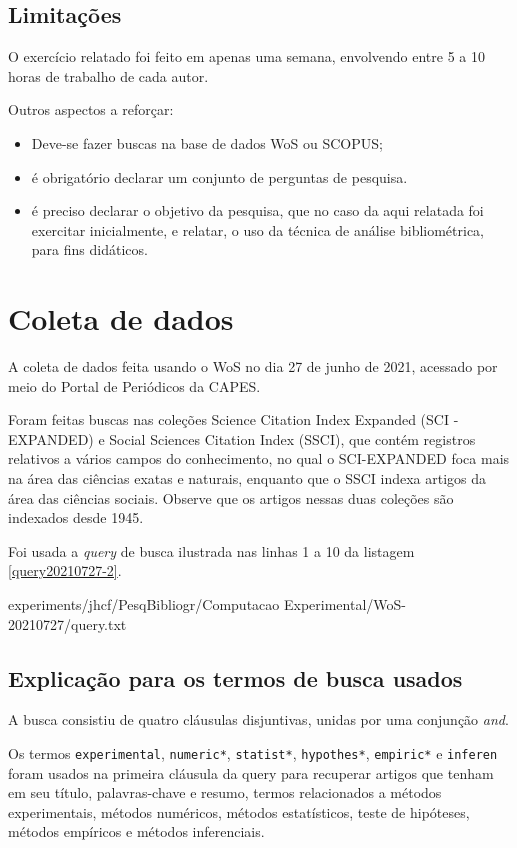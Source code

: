 \subsection{Limitações} O exercício relatado foi feito em apenas uma semana, envolvendo entre 5 a 10 horas de trabalho de cada autor.

Outros aspectos a reforçar:
\begin{itemize}
   
\item Deve-se fazer buscas na base de dados WoS ou SCOPUS;
\item é obrigatório declarar um conjunto de perguntas de pesquisa.
\item é preciso declarar o objetivo da pesquisa, que no caso da aqui relatada foi exercitar inicialmente, e relatar, o uso da técnica de análise bibliométrica, para fins didáticos.
\end{itemize}


\section{Coleta de dados}

A coleta de dados feita usando o WoS no dia 27 de junho de 2021, acessado por meio do Portal de Periódicos da CAPES.

Foram feitas buscas nas coleções Science  Citation  Index  Expanded (SCI -EXPANDED) e Social  Sciences  Citation  Index (SSCI), que contém registros relativos a vários campos do conhecimento, no qual o SCI-EXPANDED foca mais na área das ciências exatas e naturais, enquanto que o SSCI indexa artigos da área das ciências sociais. Observe que os artigos nessas duas coleções são indexados desde 1945. 

Foi usada a \textit{query} de busca ilustrada nas linhas 1 a 10 da listagem \ref{query20210727-2}.


{experiments/jhcf/PesqBibliogr/Computacao Experimental/WoS-20210727/query.txt}

\subsection{Explicação para os termos de busca usados}
A busca consistiu de quatro cláusulas disjuntivas, unidas por uma conjunção \textit{and}.

Os termos \texttt{experimental}, \texttt{numeric*}, \texttt{statist*}, \texttt{hypothes*}, 
\texttt{empiric*}
e \texttt{inferen} foram usados na primeira cláusula da query para recuperar artigos que tenham em seu título, palavras-chave e resumo, termos relacionados a métodos experimentais,
métodos numéricos,
métodos estatísticos,
teste de hipóteses,
métodos empíricos e métodos inferenciais.

